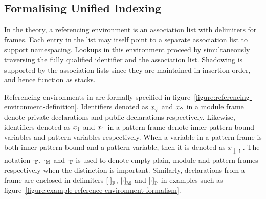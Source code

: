 \subsection{Formalising Unified Indexing}\label{section:formalising-unified-indexing}

In the theory, a referencing environment is an association list with delimiters for frames.
Each entry in the list may itself point to a separate association list to support namespacing.
Lookups in this environment proceed by simultaneously traversing the fully qualified identifier and the association list.
Shadowing is supported by the association lists since they are maintained in insertion order, and hence function as stacks.

Referencing environments in \Beluga are formally specified in figure~\ref{figure:referencing-environment-definition}.
Identifiers denoted as $x_\Downarrow$ and $x_\Uparrow$ in a module frame denote private declarations and public declarations respectively.
Likewise, identifiers denoted as $x_\downarrow$ and $x_\uparrow$ in a pattern frame denote inner pattern-bound variables and pattern variables respectively.
When a variable in a pattern frame is both inner pattern-bound and a pattern variable, then it is denoted as $x_{\downarrow\uparrow}$.
The notation $\cdot_{\mathbb{F}}$, $\cdot_{\mathbb{M}}$ and $\cdot_{\mathbb{P}}$ is used to denote empty plain, module and pattern frames respectively when the distinction is important.
Similarly, declarations from a frame are enclosed in delimiters $\left[\cdot\right]_{\mathbb{F}}$, $\left[\cdot\right]_{\mathbb{M}}$ and $\left[\cdot\right]_{\mathbb{P}}$ in examples such as figure~\ref{figure:example-reference-environment-formalism}.

